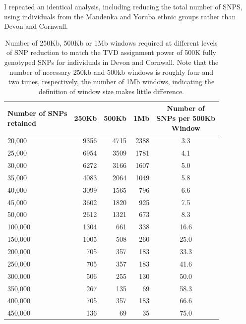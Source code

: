 I repeated an identical analysis, including reducing the total number of SNPS, using individuals from the Mandenka and Yoruba ethnic groups rather than Devon and Cornwall.  

\begin{table}[!h]
\centering
\begin{tabular}[t]{lrrrc}
\toprule
\thead{Number of SNPs\\ retained} & 250Kb & 500Kb & 1Mb & \thead{Number of\\ SNPs per 500Kb \\Window}\\
\midrule
20,000 & 9356 & 4715 & 2388 & 3.3\\
25,000 & 6954 & 3509 & 1781 & 4.1\\
30,000 & 6272 & 3166 & 1607 & 5.0\\
35,000 & 4083 & 2064 & 1049 & 5.8\\
40,000 & 3099 & 1565 & 796 & 6.6\\
45,000 & 3602 & 1820 & 925 & 7.5\\
50,000 & 2612 & 1321 & 673 & 8.3\\
100,000 & 1304 & 661 & 338 & 16.6\\
150,000 & 1005 & 508 & 260 & 25.0\\
200,000 & 705 & 357 & 183 & 33.3\\
250,000 & 705 & 357 & 183 & 41.6\\
300,000 & 506 & 255 & 130 & 50.0\\
350,000 & 267 & 135 & 69 & 58.3\\
400,000 & 705 & 357 & 183 & 66.6\\
450,000 & 136 & 69 & 35 & 75.0\\
\bottomrule
\end{tabular}
\caption{Number of 250Kb, 500Kb or 1Mb windows required at different levels of SNP reduction to match the TVD assignment power of 500K fully genotyped SNPs for individuals in Devon and Cornwall. Note that the number of necessary 250kb and 500kb windows is roughly four and two times, respectively, the number of 1Mb windows, indicating the definition of window size makes little difference.}
\label{table:windows_power_table_DevCorn}
\end{table}

